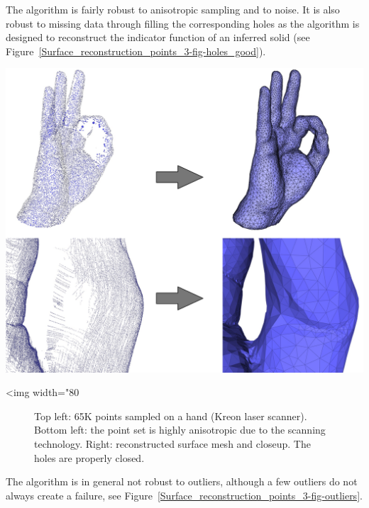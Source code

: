The algorithm is fairly robust to anisotropic sampling and to noise. It is also robust to missing data through filling the corresponding holes as the algorithm is designed to reconstruct the indicator function of an inferred solid (see Figure~\ref{Surface_reconstruction_points_3-fig-holes_good}).

\begin{center}
    \label{Surface_reconstruction_points_3-fig-holes_good}
    \begin{ccTexOnly}
\includegraphics[width=1.0\textwidth]{Surface_reconstruction_points_3/holes_good}
    \end{ccTexOnly}
    \begin{ccHtmlOnly}
        <img width="80%
    \end{ccHtmlOnly}
    \begin{figure}[h]
        \caption{Top left: 65K points sampled on a hand (Kreon laser scanner).
                 Bottom left: the point set is highly anisotropic due
                 to the scanning technology.
                 Right: reconstructed surface mesh and closeup.
                 The holes are properly closed.}
    \end{figure}
\end{center}


The algorithm is in general not robust to outliers, although a few outliers do not always create a failure, see Figure~\ref{Surface_reconstruction_points_3-fig-outliers}.

